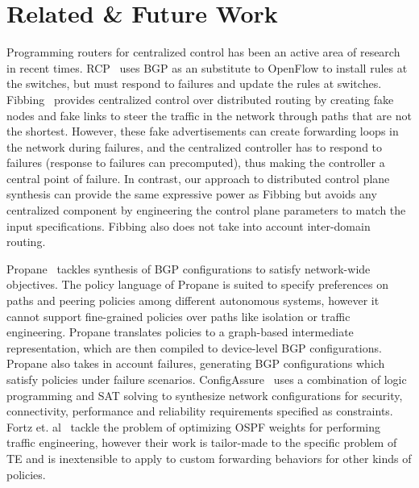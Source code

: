 \section{Related \& Future Work}\label{sec:related}
Programming routers for centralized control has been an
active area of research in recent times. RCP~\cite{rcp} uses
BGP as an substitute to OpenFlow to install rules at the 
switches, but must respond to failures and update the 
rules at switches. Fibbing~\cite{fibbing} provides 
centralized control over distributed routing by creating 
fake nodes and fake links to steer the traffic in the 
network through paths that are not the shortest. However, 
these fake advertisements can create forwarding loops in the
network during failures, and the centralized controller 
has to respond to failures (response to failures can precomputed),
thus making the controller a central point of failure. In contrast,
our approach to distributed control plane synthesis can provide
the same expressive power as Fibbing but 
avoids any centralized component by engineering 
the control plane parameters to match the input specifications. 
Fibbing also does not take into account inter-domain routing. 

 Propane~\cite{propane} 
tackles synthesis of BGP configurations to satisfy network-wide
objectives. The policy language of Propane is suited to specify
preferences on paths and peering policies among different autonomous
systems, however
it cannot support fine-grained policies over 
paths like isolation or traffic engineering. Propane 
translates policies to a graph-based intermediate representation,
which are then compiled to device-level BGP configurations. 
Propane also takes in account failures, generating BGP
configurations which satisfy policies under failure scenarios. 
ConfigAssure~\cite{configassure} uses a combination of 
logic programming and SAT solving to synthesize network
configurations for security, 
connectivity, performance and reliability requirements 
specified as constraints.
Fortz et. al~\cite{ospf-te} tackle the 
problem of optimizing OSPF weights for performing traffic
engineering, however their work is tailor-made to the 
specific problem of TE and is inextensible to apply 
to custom forwarding behaviors for other kinds of policies.


